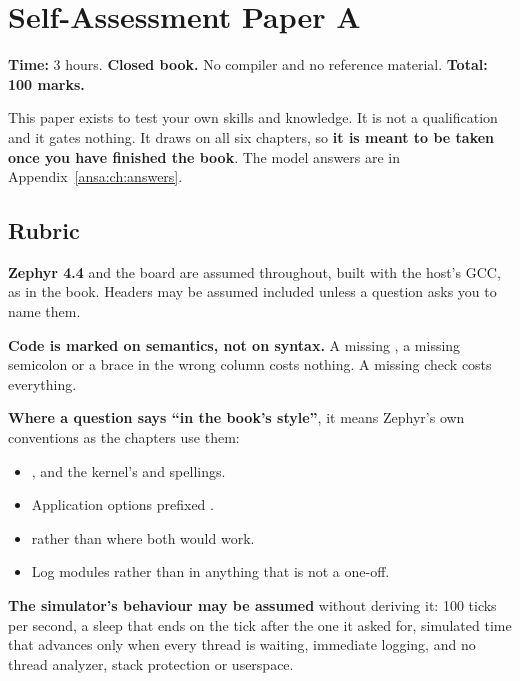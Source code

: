 
\chapter{Self-Assessment Paper A}
\label{exa:ch:paper}

\noindent\textbf{Time:} 3 hours. \textbf{Closed book.} No compiler and no reference material.
\textbf{Total: 100 marks.}

This paper exists to test your own skills and knowledge. It is not a qualification and it gates
nothing. It draws on all six chapters, so \textbf{it is meant to be taken once you have finished
the book}. The model answers are in Appendix~\ref{ansa:ch:answers}.

\section*{Rubric}
\textbf{Zephyr 4.4} and the board  are assumed throughout, built with the
host's GCC, as in the book. Headers may be assumed included unless a question asks you to name them.

\textbf{Code is marked on semantics, not on syntax.} A missing , a missing semicolon
or a brace in the wrong column costs nothing. A missing  check costs
everything.

\textbf{Where a question says ``in the book's style''}, it means Zephyr's own conventions as the
chapters use them:
\begin{itemize}
  \item {}, and the kernel's  and  spellings.
  \item Application options prefixed .
  \item {} rather than  where both would work.
  \item Log modules rather than  in anything that is not a one-off.
\end{itemize}

\textbf{The simulator's behaviour may be assumed} without deriving it: 100 ticks per second, a sleep
that ends on the tick after the one it asked for, simulated time that advances only when every
thread is waiting, immediate logging, and no thread analyzer, stack protection or userspace.

